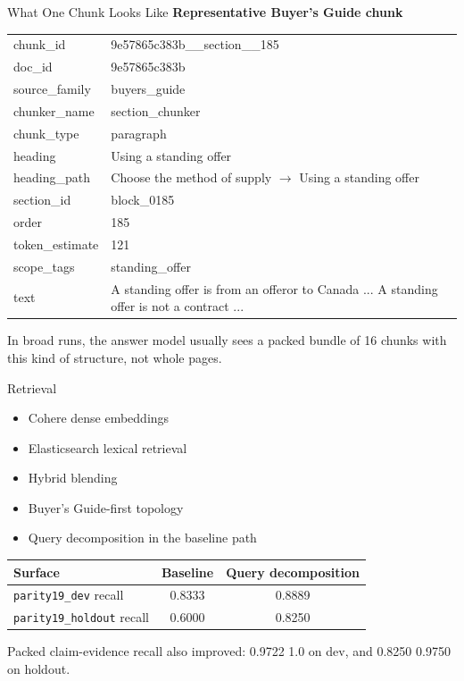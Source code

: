 \documentclass[aspectratio=169]{beamer}
\begin{document}
\begin{frame}{What One Chunk Looks Like}
  \small
  \textbf{Representative Buyer’s Guide chunk}

  \vspace{0.4em}
  \begin{tabularx}{\textwidth}{>{\ttfamily}p{} X}
    chunk\_id & 9e57865c383b\_\_section\_\_185 \\
    doc\_id & 9e57865c383b \\
    source\_family & buyers\_guide \\
    chunker\_name & section\_chunker \\
    chunk\_type & paragraph \\
    heading & Using a standing offer \\
    heading\_path & Choose the method of supply $\rightarrow$ Using a standing offer \\
    section\_id & block\_0185 \\
    order & 185 \\
    token\_estimate & 121 \\
    scope\_tags & standing\_offer \\
    text & A standing offer is from an offeror to Canada ... A standing offer is not a contract ... \\
  \end{tabularx}

  \vspace{0.5em}
  In broad runs, the answer model usually sees a packed bundle of 16 chunks
  with this kind of structure, not whole pages.
\end{frame}

\begin{frame}{Retrieval}
  \begin{itemize}
    \item Cohere dense embeddings
    \item Elasticsearch lexical retrieval
    \item Hybrid blending
    \item Buyer’s Guide-first topology
    \item Query decomposition in the baseline path
  \end{itemize}

  \vspace{0.5em}
  \centering
  \begin{tabular}{lcc}
    \toprule
    Surface & Baseline & Query decomposition \\
    \midrule
    \texttt{parity19\_dev} recall & 0.8333 & 0.8889 \\
    \texttt{parity19\_holdout} recall & 0.6000 & 0.8250 \\
    \bottomrule
  \end{tabular}

  \vspace{0.5em}
  Packed claim-evidence recall also improved:
  0.9722 \textrightarrow{} 1.0 on dev, and 0.8250 \textrightarrow{} 0.9750 on holdout.
\end{frame}
\end{document}
